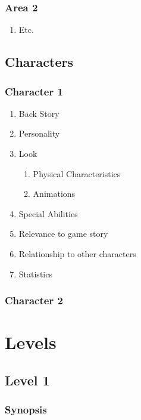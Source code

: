 \documentclass[article, 11pt]{article}
\begin{document}
\subsubsection{Area 2}
\label{sec:orga88d4fe}
\begin{enumerate}
\item Etc.
\label{sec:orga12cd86}
\end{enumerate}
\subsection{Characters}
\label{sec:orgb10fc3b}
\subsubsection{Character 1}
\label{sec:org0ee6148}
\begin{enumerate}
\item Back Story
\label{sec:org3cd49f9}
\item Personality
\label{sec:org51c817e}
\item Look
\label{sec:org769ff2a}
\begin{enumerate}
\item Physical Characteristics
\label{sec:orgbb0ade0}
\item Animations
\label{sec:org1cb9045}
\end{enumerate}
\item Special Abilities
\label{sec:orgcf01417}
\item Relevance to game story
\label{sec:org7047a71}
\item Relationship to other characters
\label{sec:org4a9f279}
\item Statistics
\label{sec:org8d5a074}
\end{enumerate}
\subsubsection{Character 2}
\label{sec:orge874286}

\section{Levels}
\label{sec:org20204b1}
\subsection{Level 1}
\label{sec:org26baa69}
\subsubsection{Synopsis}
\label{sec:orgd9b5ac3}
\end{document}
